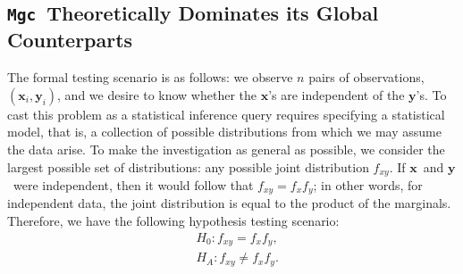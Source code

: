 \documentclass[11pt]{article}
\providecommand{\sct}[1]{{\sc \texttt{#1}}}
\providecommand{\mb}[1]{\boldsymbol{#1}}
\newcommand{\Real}{\mathbb{R}}
\newcommand{\Mgc}{\sct{Mgc}}
\newcommand{\mbx}{\ensuremath{\mb{x}}}
\newcommand{\mby}{\ensuremath{\mb{y}}}
\begin{document}
\subsection*{\Mgc~Theoretically Dominates its Global Counterparts}
\label{s:theory}

The formal testing scenario is as follows: we observe $n$ pairs of observations, $(\mbx_i,\mby_i)$, and we desire to know whether the \mbx's are independent of the \mby's.  To cast this problem as a statistical inference query requires specifying a statistical model, that is, a collection of possible distributions from which we may assume the data arise.  To make the investigation as general as possible, we consider the largest possible set of distributions: any possible joint distribution $f_{xy}$. If \mbx~and \mby~were independent, then it would follow that $f_{xy}=f_x f_y$; in other words, for independent data, the joint distribution is equal to the product of the marginals.  Therefore, we have the following hypothesis testing scenario:
\begin{align*}
& H_{0}: f_{xy}=f_{x}f_{y},\\
& H_{A}: f_{xy} \neq f_{x}f_{y}.
\end{align*}
\end{document}
